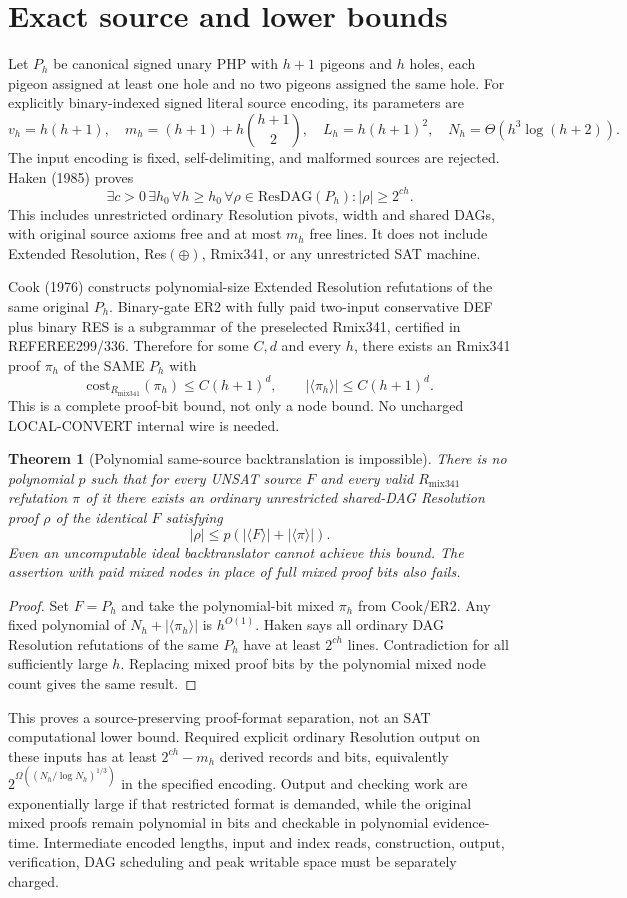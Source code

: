 \documentclass[11pt]{article}
\newtheorem{theorem}{Theorem}
\begin{document}
\section*{Exact source and lower bounds}
Let $P_h$ be canonical signed unary PHP with $h+1$ pigeons and $h$ holes, each pigeon assigned at least one hole and no two pigeons assigned the same hole. For explicitly binary-indexed signed literal source encoding, its parameters are
\[
v_h=h(h+1),\quad m_h=(h+1)+h\binom{h+1}{2},\quad
L_h=h(h+1)^2,\quad N_h=\Theta(h^3\log(h+2)).
\]
The input encoding is fixed, self-delimiting, and malformed sources are rejected. Haken (1985) proves
\[
\exists c>0\,\exists h_0\,\forall h\ge h_0\,
\forall\rho\in\mathrm{ResDAG}(P_h):|\rho|\ge2^{ch}.
\]
This includes unrestricted ordinary Resolution pivots, width and shared DAGs, with original source axioms free and at most $m_h$ free lines. It does not include Extended Resolution, Res$(\oplus)$, Rmix341, or any unrestricted SAT machine.

Cook (1976) constructs polynomial-size Extended Resolution refutations of the same original $P_h$. Binary-gate ER2 with fully paid two-input conservative DEF plus binary RES is a subgrammar of the preselected Rmix341, certified in REFEREE299/336. Therefore for some $C,d$ and every $h$, there exists an Rmix341 proof $\pi_h$ of the SAME $P_h$ with
\[
\mathrm{cost}_{R_{\mathrm{mix341}}}(\pi_h)\le C(h+1)^d,\qquad
|\langle\pi_h\rangle|\le C(h+1)^d.
\]
This is a complete proof-bit bound, not only a node bound. No uncharged LOCAL-CONVERT internal wire is needed.

\begin{theorem}[Polynomial same-source backtranslation is impossible]
There is no polynomial $p$ such that for every UNSAT source $F$ and every valid $R_{\mathrm{mix341}}$ refutation $\pi$ of it there exists an ordinary unrestricted shared-DAG Resolution proof $\rho$ of the identical $F$ satisfying
\[
|\rho|\le p(|\langle F\rangle|+|\langle\pi\rangle|).
\]
Even an uncomputable ideal backtranslator cannot achieve this bound. The assertion with paid mixed nodes in place of full mixed proof bits also fails.
\end{theorem}
\begin{proof}
Set $F=P_h$ and take the polynomial-bit mixed $\pi_h$ from Cook/ER2. Any fixed polynomial of $N_h+|\langle\pi_h\rangle|$ is $h^{O(1)}$. Haken says all ordinary DAG Resolution refutations of the same $P_h$ have at least $2^{ch}$ lines. Contradiction for all sufficiently large $h$. Replacing mixed proof bits by the polynomial mixed node count gives the same result.
\end{proof}
This proves a source-preserving proof-format separation, not an SAT computational lower bound. Required explicit ordinary Resolution output on these inputs has at least $2^{ch}-m_h$ derived records and bits, equivalently $2^{\Omega((N_h/\log N_h)^{1/3})}$ in the specified encoding. Output and checking work are exponentially large if that restricted format is demanded, while the original mixed proofs remain polynomial in bits and checkable in polynomial evidence-time. Intermediate encoded lengths, input and index reads, construction, output, verification, DAG scheduling and peak writable space must be separately charged.
\end{document}
